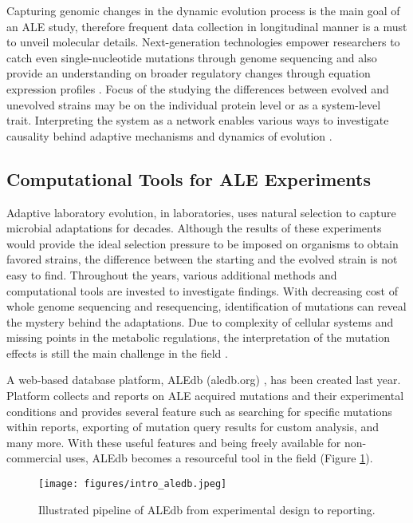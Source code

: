 Capturing genomic changes in the dynamic evolution process is the main goal of an ALE study, therefore frequent data collection in longitudinal manner is a must to unveil molecular details. Next-generation technologies empower researchers to catch even single-nucleotide mutations through genome sequencing and also provide an understanding on broader regulatory changes through equation expression profiles \cite{conrad2011microbial}. Focus of the studying the differences between evolved and unevolved strains may be on the individual protein level or as a system-level trait. Interpreting the system as a network enables various ways to investigate causality behind adaptive mechanisms and dynamics of evolution \cite{soyer2013evolutionary, long2018adaptive}.

\subsection{Computational Tools for ALE Experiments}

Adaptive laboratory evolution, in laboratories, uses natural selection to capture microbial adaptations for decades. Although the results of these experiments would provide the ideal selection pressure to be imposed on organisms to obtain favored strains, the difference between the starting and the evolved strain is not easy to find. Throughout the years, various additional methods and computational tools are invested to investigate findings. With decreasing cost of whole genome sequencing and resequencing, identification of mutations can reveal the mystery behind the adaptations. Due to complexity of cellular systems and missing points in the metabolic regulations, the interpretation of the mutation effects is still the main challenge in the field \cite{palsson2011adaptive}.

A web-based database platform, ALEdb (aledb.org) \cite{phaneuf2019aledb}, has been created last year. Platform collects and reports on ALE acquired mutations and their experimental conditions and provides several feature such as searching for specific mutations within reports, exporting of mutation query results for custom analysis, and many more. With these useful features and being freely available for non-commercial uses, ALEdb becomes a resourceful tool in the field (Figure \ref{fig:intro_aledb}).
\vspace{1cm}
\begin{figure}[H]
\begin{center}
\texttt{[image: figures/intro\_aledb.jpeg]}
\caption[Illustrated pipeline of ALEdb from experimental design to reportingt]{Illustrated pipeline of ALEdb\cite{phaneuf2019aledb} from experimental design to reporting.}
\label{fig:intro_aledb}
\end{center}
\end{figure}

